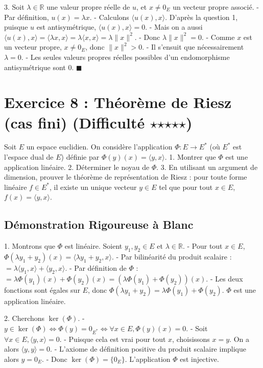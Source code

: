 \documentclass{report}
\begin{document}
3. Soit $\lambda \in \mathbb{R}$ une valeur propre réelle de $u$, et $x \neq 0_E$ un vecteur propre associé.
   - Par définition, $u(x) = \lambda x$.
   - Calculons $\langle u(x), x \rangle$. D'après la question 1, puisque $u$ est antisymétrique, $\langle u(x), x \rangle = 0$.
   - Mais on a aussi $\langle u(x), x \rangle = \langle \lambda x, x \rangle = \lambda \langle x, x \rangle = \lambda \|x\|^2$.
   - Donc $\lambda \|x\|^2 = 0$.
   - Comme $x$ est un vecteur propre, $x \neq 0_E$, donc $\|x\|^2 > 0$.
   - Il s'ensuit que nécessairement $\lambda = 0$.
   - Les seules valeurs propres réelles possibles d'un endomorphisme antisymétrique sont $0$.
   $\blacksquare$

\newpage


\chapter*{Exercice 8 : Théorème de Riesz (cas fini) (Difficulté $\star$$\star$$\star$$\star$$\star$)}

Soit $E$ un espace euclidien. On considère l'application $\Phi : E \to E^*$ (où $E^*$ est l'espace dual de $E$) définie par $\Phi(y)(x) = \langle y, x \rangle$.
1. Montrer que $\Phi$ est une application linéaire.
2. Déterminer le noyau de $\Phi$.
3. En utilisant un argument de dimension, prouver le théorème de représentation de Riesz : pour toute forme linéaire $f \in E^*$, il existe un unique vecteur $y \in E$ tel que pour tout $x \in E$, $f(x) = \langle y, x \rangle$.

\section*{Démonstration Rigoureuse à Blanc}

1. Montrons que $\Phi$ est linéaire. Soient $y_1, y_2 \in E$ et $\lambda \in \mathbb{R}$.
   - Pour tout $x \in E$, $\Phi(\lambda y_1 + y_2)(x) = \langle \lambda y_1 + y_2, x \rangle$.
   - Par bilinéarité du produit scalaire : $= \lambda \langle y_1, x \rangle + \langle y_2, x \rangle$.
   - Par définition de $\Phi$ : $= \lambda \Phi(y_1)(x) + \Phi(y_2)(x) = (\lambda \Phi(y_1) + \Phi(y_2))(x)$.
   - Les deux fonctions sont égales sur $E$, donc $\Phi(\lambda y_1 + y_2) = \lambda \Phi(y_1) + \Phi(y_2)$. $\Phi$ est une application linéaire.

2. Cherchons $\ker(\Phi)$.
   - $y \in \ker(\Phi) \iff \Phi(y) = 0_{E^*} \iff \forall x \in E, \Phi(y)(x) = 0$.
   - Soit $\forall x \in E, \langle y, x \rangle = 0$.
   - Puisque cela est vrai pour tout $x$, choisissons $x = y$. On a alors $\langle y, y \rangle = 0$.
   - L'axiome de définition positive du produit scalaire implique alors $y = 0_E$.
   - Donc $\ker(\Phi) = \{0_E\}$. L'application $\Phi$ est injective.
\end{document}
